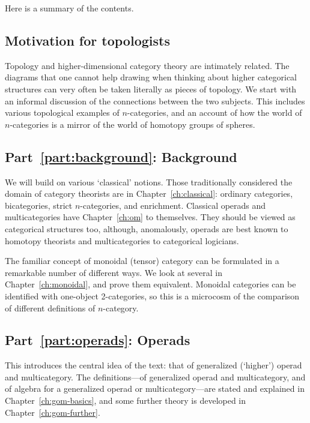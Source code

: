 Here is a summary of the contents.


\subsection*{Motivation for topologists}

Topology and higher-dimensional category theory are intimately related.
The diagrams that one cannot help drawing when thinking about higher
categorical structures can very often be taken literally as pieces of
topology.  We start with an informal discussion of the connections between
the two subjects.  This includes various topological examples of
$n$-categories, and an account of how the world of $n$-categories is a
mirror of the world of homotopy groups of spheres.


\subsection*{Part~\ref{part:background}: Background}

We will build on various `classical' notions.  Those traditionally
considered the domain of category theorists are in
Chapter~\ref{ch:classical}: ordinary categories, bicategories, strict
$n$-categories, and enrichment.  Classical operads and multicategories have
Chapter~\ref{ch:om} to themselves.  They should be viewed as categorical
structures too, although, anomalously, operads are best known to homotopy
theorists and multicategories to categorical logicians.

The familiar concept of monoidal (tensor) category can be formulated in a
remarkable number of different ways.  We look at several in
Chapter~\ref{ch:monoidal}, and prove them equivalent.  Monoidal categories
can be identified with one-object 2-categories, so this is a microcosm of
the comparison of different definitions of $n$-category.



\subsection*{Part~\ref{part:operads}: Operads} 

This introduces the central idea of the text: that
of generalized (`higher') operad and multicategory.  The definitions---of
generalized operad and multicategory, and of algebra for a generalized operad
or multicategory---are stated and explained in
Chapter~\ref{ch:gom-basics}, and some further theory is developed in
Chapter~\ref{ch:gom-further}.  

